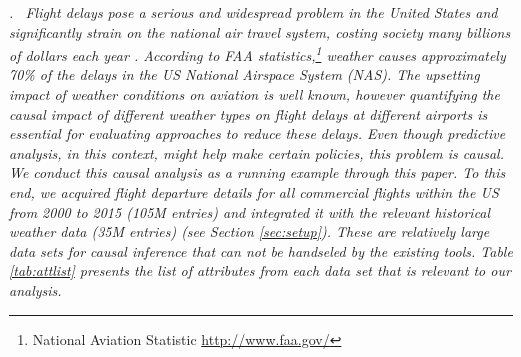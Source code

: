 \begin{example} \em \delay. \ \em   Flight delays pose a serious
and widespread problem in the United States and
 significantly strain on the national air travel system, costing society many billions of dollars each year \cite{ball2010total}.
 According to FAA statistics,\footnote{National Aviation Statistic \url{http://www.faa.gov/}}
   weather causes approximately 70\% of the delays in the US National Airspace System (NAS). The upsetting impact
   of weather conditions on aviation is well known, however quantifying
  the causal impact of different weather types on flight delays
at different airports is essential for evaluating
approaches to reduce these delays. Even though predictive analysis, in this context, might help make certain policies,
this problem is causal. We conduct this causal analysis as a running example through this paper. To this end,
we acquired flight departure details for all commercial flights within the US from 2000 to 2015
(105M entries) and integrated it with the relevant historical weather data (35M entries) (see Section \ref{sec:setup}).
These are relatively large data sets for causal inference that can not be handseled by the existing tools. Table \ref{tab:attlist} presents
the list of attributes from each data set that is relevant to our analysis.









\end{example}
